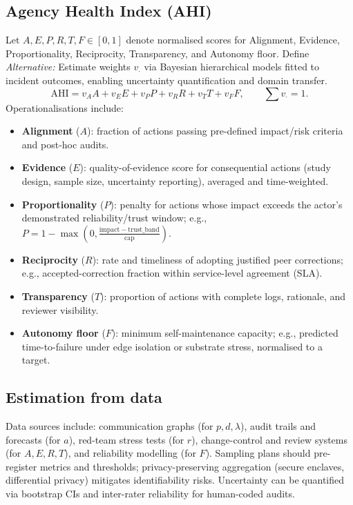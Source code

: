 \documentclass[12pt]{article}
\begin{document}
\subsection{Agency Health Index (AHI)}
Let $A,E,P,R,T,F\in[0,1]$ denote normalised scores for Alignment, Evidence, Proportionality, Reciprocity, Transparency, and Autonomy floor. Define
\emph{Alternative:} Estimate weights $v_{\cdot}$ via Bayesian hierarchical models fitted to incident outcomes, enabling uncertainty quantification and domain transfer.
\begin{equation}
\mathrm{AHI}=v_A A+v_E E+v_P P+v_R R+v_T T+v_F F,\qquad \sum v_{\cdot}=1.
\end{equation}
Operationalisations include:
\begin{itemize}[leftmargin=1.2em]
\item \textbf{Alignment} ($A$): fraction of actions passing pre-defined impact/risk criteria and post-hoc audits.
\item \textbf{Evidence} ($E$): quality-of-evidence score for consequential actions (study design, sample size, uncertainty reporting), averaged and time-weighted.
\item \textbf{Proportionality} ($P$): penalty for actions whose impact exceeds the actor's demonstrated reliability/trust window; e.g., $P=1-\max(0,\frac{\mathrm{impact}-\mathrm{trust\_band}}{\mathrm{cap}})$.
\item \textbf{Reciprocity} ($R$): rate and timeliness of adopting justified peer corrections; e.g., accepted-correction fraction within service-level agreement (SLA).
\item \textbf{Transparency} ($T$): proportion of actions with complete logs, rationale, and reviewer visibility.
\item \textbf{Autonomy floor} ($F$): minimum self-maintenance capacity; e.g., predicted time-to-failure under edge isolation or substrate stress, normalised to a target.
\end{itemize}

\subsection{Estimation from data}
Data sources include: communication graphs (for $p,d,\lambda$), audit trails and forecasts (for $a$), red-team stress tests (for $r$), change-control and review systems (for $A,E,R,T$), and reliability modelling (for $F$). Sampling plans should pre-register metrics and thresholds; privacy-preserving aggregation (secure enclaves, differential privacy) mitigates identifiability risks. Uncertainty can be quantified via bootstrap CIs and inter-rater reliability for human-coded audits.
\end{document}
